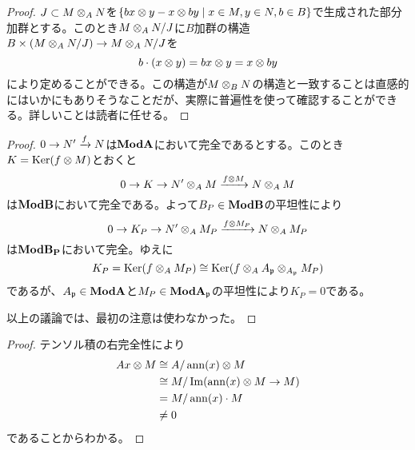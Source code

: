 \begin{proof}
  $J \subset M \otimes_A N$を$\left\{ bx \otimes y - x \otimes by \mathrel{} \middle| \mathrel{} x \in M, y \in N , b \in B \right\}$で生成された部分加群とする。このとき$M \otimes_A N / J$に$B$加群の構造$B \times (M \otimes_A N / J) \to M \otimes_A N / J$を
  \[
  b \cdot (x \otimes y) = bx \otimes y = x \otimes by
  \]
  により定めることができる。この構造が$M \otimes_B N$の構造と一致することは直感的にはいかにもありそうなことだが、実際に普遍性を使って確認することができる。詳しいことは読者に任せる。
\end{proof}



\begin{proof}
  $0 \to N' \xrightarrow{f} N $は$\textbf{Mod}\mathbf{A}$において完全であるとする。このとき$K = \operatorname{Ker} (f \otimes M)$とおくと
  \[
  0 \to K \to N' \otimes_A M \xrightarrow{f \otimes M} N \otimes_A M
  \]
  は$\textbf{Mod}\mathbf{B}$において完全である。よって$B_P \in \textbf{Mod}\mathbf{B}$の平坦性により
  \[
    0 \to K_P \to N' \otimes_A M_P \xrightarrow{f \otimes M_P} N \otimes_A M_P
  \]
  は$\textbf{Mod}\mathbf{B_P}$において完全。ゆえに
  \[
  K_P = \operatorname{Ker} (f \otimes_A M_P) \cong \operatorname{Ker} (f \otimes_A A_{\mathfrak{p}} \otimes_{A_{\mathfrak{p}}}  M_P )
  \]
  であるが、$A_{\mathfrak{p}} \in \textbf{Mod}\mathbf{A}$と$M_P \in \textbf{Mod}\mathbf{A_{\mathfrak{p}}}$の平坦性により$K_P = 0$である。

  以上の議論では、最初の注意は使わなかった。
\end{proof}




\begin{proof}
  テンソル積の右完全性により
  \begin{align*}
      Ax \otimes M &\cong A / \operatorname{ann}(x) \otimes M \\
      &\cong M / \operatorname{Im} ( \operatorname{ann}(x) \otimes M \to M)  \\
      &= M / \operatorname{ann}(x) \cdot M \\
      &\neq 0
  \end{align*}
  であることからわかる。
\end{proof}



